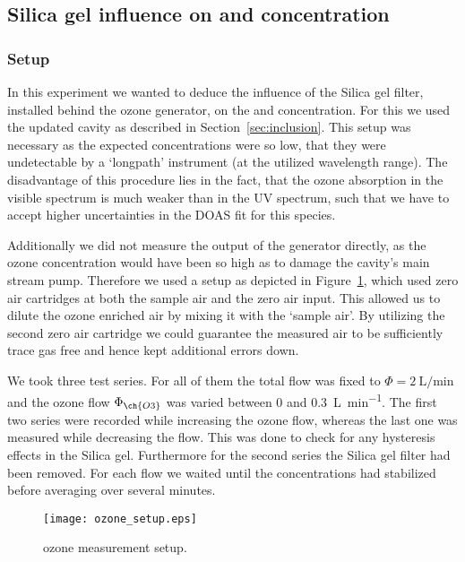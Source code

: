 \subsection{Silica gel influence on  and  concentration}
\label{sec:silica}

\subsubsection{Setup}
\label{sec:silica-setup}

In this experiment we wanted to deduce the influence of the Silica gel
filter, installed behind the ozone generator, on the  and
 concentration. For this we used the updated cavity as
described in Section~\ref{sec:inclusion}. This setup was necessary as
the expected  concentrations were so low, that they were
undetectable by a `longpath' instrument (at the utilized wavelength
range). The disadvantage of this procedure lies in the fact, that the
ozone absorption in the visible spectrum is much weaker than in the UV
spectrum, such that we have to accept higher uncertainties in the DOAS
fit for this species.

Additionally we did not measure the output of the generator directly,
as the ozone concentration would have been so high as to damage the cavity's
main stream pump. Therefore we used a setup as depicted
in Figure~\ref{fig:ozone-flow-setup}, which used zero air cartridges at
both the sample air and the zero air input. This allowed us to dilute
the ozone enriched air by mixing it with the `sample air'. By
utilizing the second zero air cartridge we could guarantee the
measured air to be sufficiently trace gas free and hence kept
additional errors down. 

We took three test series. For all of them the total flow was fixed to
$\Phi = \SI{2}{\liter\per\minute}$ and the ozone flow $\Phi_{\ch{O3}}$
was varied between \num{0} and \SI{0.3}{\liter\per\minute}. The first
two series were recorded while increasing the ozone flow, whereas the
last one was measured while decreasing the flow. This was done to
check for any hysteresis effects in the Silica gel. Furthermore for
the second series the Silica gel filter had been removed. For each
flow we waited until the concentrations had stabilized before
averaging over several minutes.

\begin{figure}[htbp]
  \centering
  \texttt{[image: ozone\_setup.eps]}
  \caption{ozone measurement setup.}
  \label{fig:ozone-flow-setup}
\end{figure}

